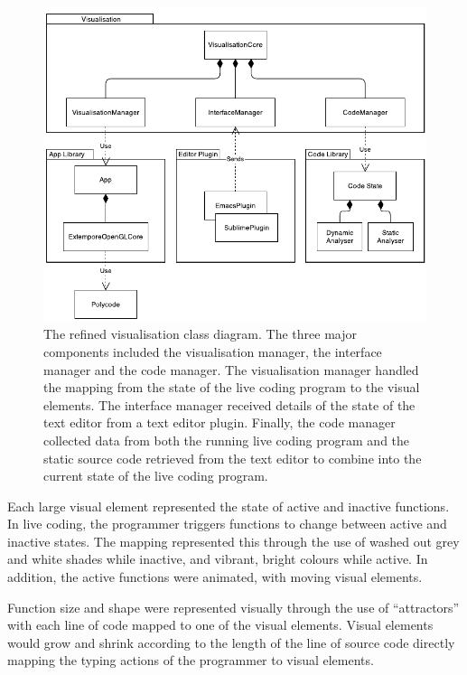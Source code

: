 \begin{figure}
  \centering \includegraphics[width=\columnwidth]{../images/diagrams/visualisation-class-diagram.pdf}
  \caption[The refined visualisation class diagram]{The refined visualisation class diagram. The three major components included the visualisation manager, the interface manager and the code manager. The visualisation manager handled the mapping from the state of the live coding program to the visual elements. The interface manager received details of the state of the text editor from a text editor plugin. Finally, the code manager collected data from both the running live coding program and the static source code retrieved from the text editor to combine into the current state of the live coding program.}
\label{fig:visualisation-class-diagram}
\end{figure}

Each large visual element represented the state of active and inactive functions. In live coding, the programmer triggers functions to change between active and inactive states. The mapping represented this through the use of washed out grey and white shades while inactive, and vibrant, bright colours while active. In addition, the active functions were animated, with moving visual elements.

Function size and shape were represented visually through the use of ``attractors'' with each line of code mapped to one of the visual elements. Visual elements would grow and shrink according to the length of the line of source code directly mapping the typing actions of the programmer to visual elements.

